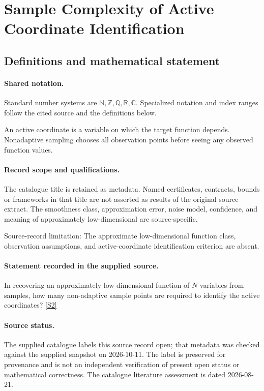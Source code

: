 \documentclass[11pt]{article}
\newcommand{\sref}[2]{\hyperlink{source:#1:#2}{[S#2]}}
\begin{document}
\section{Sample Complexity of Active Coordinate Identification}\label{statement}

\subsection{Definitions and mathematical statement}

\paragraph{Shared notation.}Standard number systems are $\mathbb N,\mathbb Z,\mathbb Q,\mathbb R,\mathbb C$. Specialized notation and index ranges follow the cited source and the definitions below.


An active coordinate is a variable on which the target function depends. Nonadaptive sampling chooses all observation points before seeing any observed function values.
\paragraph{Record scope and qualifications.}
The catalogue title is retained as metadata. Named certificates, contracts, bounds or frameworks in that title are not asserted as results of the original source extract.
The smoothness class, approximation error, noise model, confidence, and meaning of approximately low-dimensional are source-specific.

Source-record limitation: The approximate low-dimensional function class, observation assumptions, and active-coordinate identification criterion are absent.
\paragraph{Statement recorded in the supplied source.}
In recovering an approximately low-dimensional function of $N$ variables from samples, how many non-adaptive sample points are required to identify the active coordinates? \sref{statement}{2}
\paragraph{Source status.}
The supplied catalogue labels this source record open; that metadata was checked against the supplied snapshot on 2026-10-11. The label is preserved for provenance and is not an independent verification of present open status or mathematical correctness. The catalogue literature assessment is dated 2026-08-21.
\end{document}
